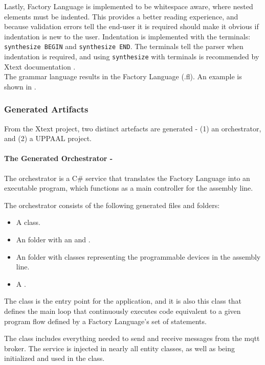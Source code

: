 Lastly, Factory Language is implemented to be whitespace aware, where nested elements must be indented. This provides a better reading experience, and because validation errors tell the end-user it is required should make it obvious if indentation is new to the user. Indentation is implemented with the terminals: \texttt{synthesize BEGIN} and \texttt{synthesize END}. The terminals tell the parser when indentation is required, and using \texttt{synthesize} with terminals is recommended by Xtext documentation \cite{xtext-language-configurations}.\\

The grammar language results in the Factory Language (.fl). An example is shown in .

\subsubsection{Generated Artifacts}\hfill

From the Xtext project, two distinct artefacts are generated - (1) an orchestrator, and (2) a UPPAAL project. 

\paragraph{The Generated Orchestrator -}

The orchestrator is a C\# service that translates the Factory Language into an executable program, which functions as a main controller for the assembly line.

The orchestrator consists of the following generated files and folders:

\begin{itemize}
    \item A  class.
    \item An  folder with an  and .
    \item An  folder with classes representing the programmable devices in the assembly line.
    \item A .
\end{itemize}

The  class is the entry point for the application, and it is also this class that defines the main loop that continuously executes code equivalent to a given program flow defined by a Factory Language's set of statements.

The  class includes everything needed to send and receive messages from the \acrshort{mqtt} broker. The service is injected in nearly all entity classes, as well as being initialized and used in the  class.


